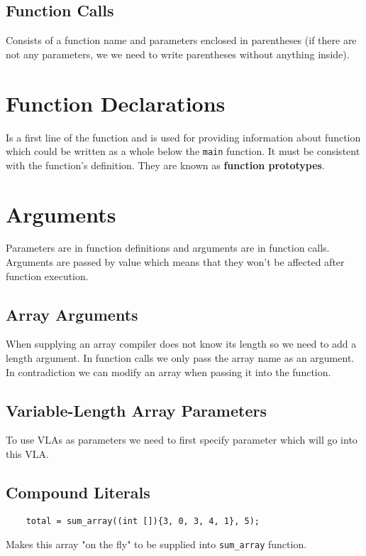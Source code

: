 \documentclass[openany]{book}
\begin{document}
    \subsection*{Function Calls}
    Consists of a function name and parameters enclosed in parentheses (if there are not any parameters, we
    we need to write parentheses without anything inside).

    \section{Function Declarations}
    Is a first line of the function and is used for providing information about function which could be written as a whole below the \texttt{main} function. It must be consistent with the function's definition. They are known as \textbf{function prototypes}. 

    \section{Arguments}
    Parameters are in function definitions and arguments are in function calls. Arguments are passed by value which means that they won't be affected after function execution. 

    \subsection*{Array Arguments}
    When supplying an array compiler does not know its length so we need to add a length argument. In function calls we only pass the array name as an argument. In contradiction we can modify an array when passing it into the function.

    \subsection*{Variable-Length Array Parameters}
    To use VLAs as parameters we need to first specify parameter which will go into this VLA.

    \subsection*{Compound Literals}
    \begin{lstlisting}
    total = sum_array((int []){3, 0, 3, 4, 1}, 5);
    \end{lstlisting}
    Makes this array "on the fly" to be supplied into \texttt{sum\_array} function.
\end{document}
